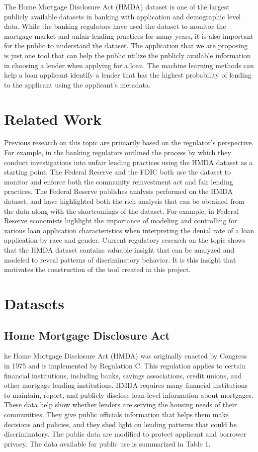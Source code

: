 \documentclass[conference,compsoc]{IEEEtran}
\begin{document}
The Home Mortgage Disclosure Act (HMDA) dataset is one of the largest publicly available datasets in banking with application and demographic level data.  While the banking regulators have used the dataset to monitor the mortgage market and unfair lending practices for many years, it is also important for the public to understand the dataset.  The application that we are proposing is just one tool that can help the public utilize the publicly available information in choosing a lender when applying for a loan.  The machine learning methods can help a loan applicant identify a lender that has the highest probability of lending to the applicant using the applicant’s metadata.  


\section{Related Work}

Previous research on this topic are primarily based on the regulator’s perspective.  For example, in \cite{FDIC} the banking regulators outlined the process by which they conduct investigations into unfair lending practices using the HMDA dataset as a starting point.  The Federal Reserve and the FDIC both use the dataset to monitor and enforce both the community reinvestment act and fair lending practices. 
The Federal Reserve publishes analysis performed on the HMDA dataset, and have highlighted both the rich analysis that can be obtained from the data along with the shortcomings of the dataset.  For example, in \cite{FED} Federal Reserve economists highlight the importance of modeling and controlling for various loan application characteristics when interpreting the denial rate of a loan application by race and gender. 
Current regulatory research on the topic shows that the HMDA dataset contains valuable insight that can be analyzed and modeled to reveal patterns of discriminatory behavior. It is this insight that motivates the construction of the tool created in this project.

\section{Datasets}


\subsection{Home Mortgage Disclosure Act}
he Home Mortgage Disclosure Act (HMDA) was originally enacted by Congress in 1975 and is implemented by Regulation C. This regulation applies to certain financial institutions, including banks, savings associations, credit unions, and other mortgage lending institutions.  HMDA requires many financial institutions to maintain, report, and publicly disclose loan-level information about mortgages. These data help show whether lenders are serving the housing needs of their communities. They give public officials information that helps them make decisions and policies, and they shed light on lending patterns that could be discriminatory. The public data are modified to protect applicant and borrower privacy. The data available for public use is summarized in Table 1.
\end{document}
